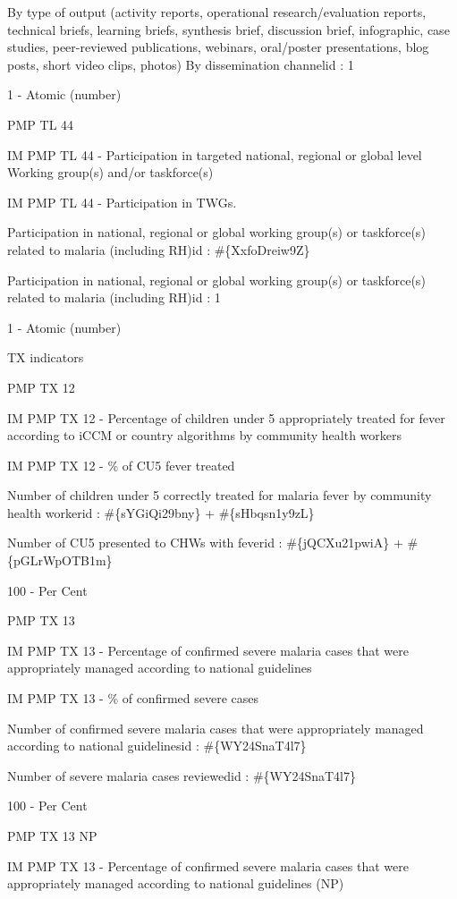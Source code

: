 \documentclass[]{book}
\begin{document}
By type of output (activity reports, operational research/evaluation reports, technical briefs, learning briefs, synthesis brief, discussion brief, infographic, case studies, peer-reviewed publications, webinars, oral/poster presentations, blog posts, short video clips, photos) By dissemination channelid : 1

1 - Atomic (number)

PMP TL 44

IM PMP TL 44 - Participation in targeted national, regional or global level Working group(s) and/or taskforce(s)

IM PMP TL 44 - Participation in TWGs.

Participation in national, regional or global working group(s) or taskforce(s) related to malaria (including RH)id : \#\{XxfoDreiw9Z\}

Participation in national, regional or global working group(s) or taskforce(s) related to malaria (including RH)id : 1

1 - Atomic (number)

TX indicators

PMP TX 12

IM PMP TX 12 - Percentage of children under 5 appropriately treated for fever according to iCCM or country algorithms by community health workers

IM PMP TX 12 - \% of CU5 fever treated

Number of children under 5 correctly treated for malaria fever by community health workerid : \#\{sYGiQi29bny\} + \#\{sHbqsn1y9zL\}

Number of CU5 presented to CHWs with feverid : \#\{jQCXu21pwiA\} + \#\{pGLrWpOTB1m\}

100 - Per Cent

PMP TX 13

IM PMP TX 13 - Percentage of confirmed severe malaria cases that were appropriately managed according to national guidelines

IM PMP TX 13 - \% of confirmed severe cases

Number of confirmed severe malaria cases that were appropriately managed according to national guidelinesid : \#\{WY24SnaT4l7\}

Number of severe malaria cases reviewedid : \#\{WY24SnaT4l7\}

100 - Per Cent

PMP TX 13 NP

IM PMP TX 13 - Percentage of confirmed severe malaria cases that were appropriately managed according to national guidelines (NP)
\end{document}
